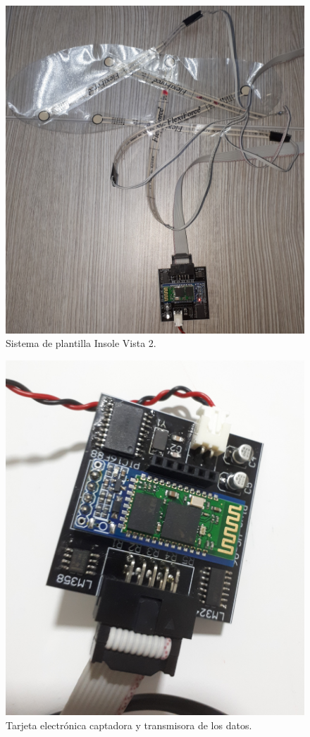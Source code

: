 \begin{figure}[H]
\centering
\includegraphics[width=1\textwidth]{./image/foto2.jpg}
\caption{Sistema de plantilla Insole Vista 2.}
\label{fig:plantillavista2}
\end{figure}

\begin{figure}[H]
\centering
\includegraphics[width=1\textwidth]{./image/foto1.jpg}
\caption{Tarjeta electrónica captadora y transmisora de los datos.}
\label{fig:Tarjeta}
\end{figure}





